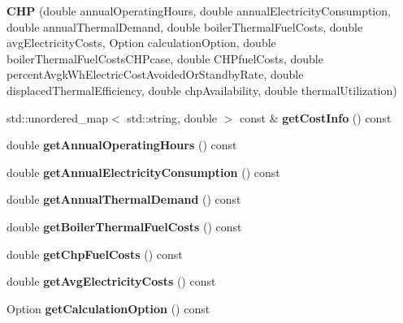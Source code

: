 \begin{DoxyCompactItemize}
\item 
\mbox{\label{class_c_h_p_aea45a2afd5189214fbf720e53d587640}} 
{\bfseries C\+HP} (double annual\+Operating\+Hours, double annual\+Electricity\+Consumption, double annual\+Thermal\+Demand, double boiler\+Thermal\+Fuel\+Costs, double avg\+Electricity\+Costs, Option calculation\+Option, double boiler\+Thermal\+Fuel\+Costs\+C\+H\+Pcase, double C\+H\+Pfuel\+Costs, double percent\+Avgk\+Wh\+Electric\+Cost\+Avoided\+Or\+Standby\+Rate, double displaced\+Thermal\+Efficiency, double chp\+Availability, double thermal\+Utilization)
\item 
\mbox{\label{class_c_h_p_a9b448b253454087f9e98124aa716715f}} 
std\+::unordered\+\_\+map$<$ std\+::string, double $>$ const  \& {\bfseries get\+Cost\+Info} () const
\item 
\mbox{\label{class_c_h_p_aeeb03f1f40db034babf883a1e00ed2a3}} 
double {\bfseries get\+Annual\+Operating\+Hours} () const
\item 
\mbox{\label{class_c_h_p_a37d544d03c45668a9dc5d502cdcb6137}} 
double {\bfseries get\+Annual\+Electricity\+Consumption} () const
\item 
\mbox{\label{class_c_h_p_a849a576483b92b131ebfc0615e1e0bdb}} 
double {\bfseries get\+Annual\+Thermal\+Demand} () const
\item 
\mbox{\label{class_c_h_p_a9f6c6638b1be7c2df8ba4b406c3b2b94}} 
double {\bfseries get\+Boiler\+Thermal\+Fuel\+Costs} () const
\item 
\mbox{\label{class_c_h_p_a00929ba5d10367258dc1dc437eda88e3}} 
double {\bfseries get\+Chp\+Fuel\+Costs} () const
\item 
\mbox{\label{class_c_h_p_a2bc5ac0eb3d7ce42f77f26b3973f6c9f}} 
double {\bfseries get\+Avg\+Electricity\+Costs} () const
\item 
\mbox{\label{class_c_h_p_a858f0201818f637331e0d06d3171bee7}} 
Option {\bfseries get\+Calculation\+Option} () const
\item 
\mbox{\label{class_c_h_p_ace1d96aacf328bd62f01e0eceaae19f6}} 

\end{DoxyCompactItemize}
